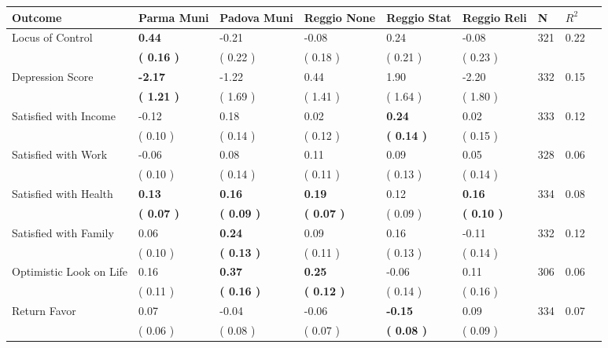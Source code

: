 \begin{tabular}{L{6.2cm} C{1.8cm} C{1.8cm} C{1.8cm} C{1.8cm} C{1.8cm} C{1.8cm} C{0.3cm} C{0.3cm}}
\toprule
 \textbf{Outcome} & \textbf{Parma Muni} & \textbf{Padova Muni} & \textbf{Reggio None} & \textbf{Reggio Stat} & \textbf{Reggio Reli} & \textbf{N} & \textbf{$ R^2$} \\
\midrule
Locus of Control & \textbf{     0.44} &     -0.21 &     -0.08 &      0.24 &     -0.08  & 321 &       0.22 \\ 
 & \textbf{(     0.16 )} & (     0.22 ) & (     0.18 ) & (     0.21 ) & (     0.23 )  & \\
Depression Score & \textbf{    -2.17} &     -1.22 &      0.44 &      1.90 &     -2.20  & 332 &       0.15 \\ 
 & \textbf{(     1.21 )} & (     1.69 ) & (     1.41 ) & (     1.64 ) & (     1.80 )  & \\
Satisfied with Income &     -0.12 &      0.18 &      0.02 & \textbf{     0.24} &      0.02  & 333 &       0.12 \\ 
 & (     0.10 ) & (     0.14 ) & (     0.12 ) & \textbf{(     0.14 )} & (     0.15 )  & \\
Satisfied with Work &     -0.06 &      0.08 &      0.11 &      0.09 &      0.05  & 328 &       0.06 \\ 
 & (     0.10 ) & (     0.14 ) & (     0.11 ) & (     0.13 ) & (     0.14 )  & \\
Satisfied with Health & \textbf{     0.13} & \textbf{     0.16} & \textbf{     0.19} &      0.12 & \textbf{     0.16}  & 334 &       0.08 \\ 
 & \textbf{(     0.07 )} & \textbf{(     0.09 )} & \textbf{(     0.07 )} & (     0.09 ) & \textbf{(     0.10 )}  & \\
Satisfied with Family &      0.06 & \textbf{     0.24} &      0.09 &      0.16 &     -0.11  & 332 &       0.12 \\ 
 & (     0.10 ) & \textbf{(     0.13 )} & (     0.11 ) & (     0.13 ) & (     0.14 )  & \\
Optimistic Look on Life &      0.16 & \textbf{     0.37} & \textbf{     0.25} &     -0.06 &      0.11  & 306 &       0.06 \\ 
 & (     0.11 ) & \textbf{(     0.16 )} & \textbf{(     0.12 )} & (     0.14 ) & (     0.16 )  & \\
Return Favor &      0.07 &     -0.04 &     -0.06 & \textbf{    -0.15} &      0.09  & 334 &       0.07 \\ 
 & (     0.06 ) & (     0.08 ) & (     0.07 ) & \textbf{(     0.08 )} & (     0.09 )  & \\

\end{tabular}
